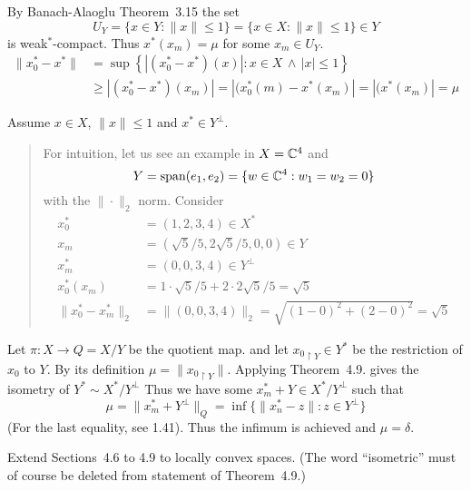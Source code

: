 \begin{enumerate}
By Banach-Alaoglu Theorem~3.15 the set
\begin{equation*}
U_Y = \{x\in Y:  \|x\| \leq 1\} = \{x\in X:  \|x\| \leq 1\} \in Y
\end{equation*}
is weak\({}^*\)-compact. Thus
\(x^*(x_m) = \mu\) for some \(x_m \in U_Y\).
\begin{align*}
\|x_0^* - x^*\| 
 &= \sup\left\{\left|(x_0^* - x^*)(x)\right|:
               x\in X \,\wedge\, |x|\leq 1\right\} \\
 &\geq \left|(x_0^* - x^*)(x_m)\right|
  = \left|(x_0^*(m) - x^*(x_m)\right|
  = \left|(x^*(x_m)\right| = \mu
\end{align*}

Assume \(x\in X\), \(\|x\| \leq 1\) and \(x^*\in Y^\perp\).

\begin{quote}
For intuition, let us see an example in \(X = \mathbb{C}^4\) and 
\begin{equation*}
Y = \textrm{span}(e_1, e_2) = \{w\in \mathbb{C}^4: w_1 = w_2 = 0\}
\end{equation*}
with the \(\|\cdot\|_2\) norm. Consider
\begin{align*}
x_0^* &= (1,2,3,4) \in X^*\\
x_m   &= (\sqrt{5}/5, 2\sqrt{5}/5, 0, 0) \in Y \\
x_m^* &= (0, 0, 3, 4) \in Y^\perp \\
x_0^*(x_m) &= 1\cdot \sqrt{5}/5 + 2\cdot 2\sqrt{5}/5 = \sqrt{5} \\
\|x_0^* - x_m^*\|_2 &= \|(0, 0, 3, 4)\|_2 = \sqrt{(1-0)^2 + (2-0)^2} = \sqrt{5}
\end{align*}
\end{quote}

Let \(\pi: X \to Q = X/Y\) be the quotient map.
and let \({x_0}_{\restriction Y} \in Y^*\) be the restriction of \(x_0\) to $Y$.
By its definition \(\mu = \|{x_0}_{\restriction Y}\|\).
Applying Theorem~4.9. gives the isometry of \(Y^* \sim X^*/Y^\perp\)
Thus we have some \(x_m^* + Y \in X^*/Y^\perp\) such that
\begin{equation*}
\mu = \|x_m^* + Y^\perp\|_Q = \inf \{\|x_n^* - z\|: z \in Y^\perp\}
\end{equation*}
(For the last equality, see 1.41).
Thus the infimum is achieved and \(\mu = \delta\).


\begin{excopy}
Extend Sections~4.6 to 4.9 to locally convex spaces.
 (The word ``isometric'' must of
course be deleted from statement of Theorem~4.9.)
\end{excopy}


\end{enumerate}
